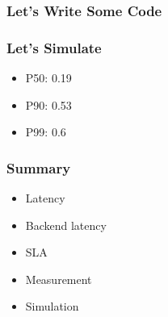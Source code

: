 \begin{frame}
\frametitle{Let's Write Some Code}



\end{frame}

\begin{frame}
\frametitle{Let's Simulate}

\begin{itemize}
\item P50: 0.19
\item P90: 0.53
\item P99: 0.6
\end{itemize}


\end{frame}

\begin{frame}
\frametitle{Summary}

\begin{itemize}
\item Latency
\item Backend latency
\item SLA
\item Measurement
\item Simulation
\end{itemize}

\end{frame}


